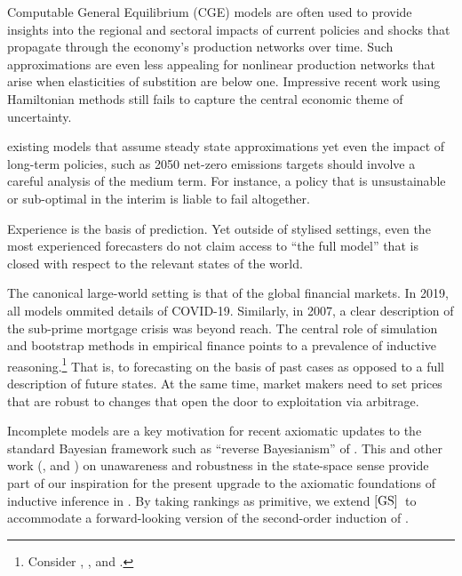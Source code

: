 \documentclass[12pt,a4paper,twoside]{article}
\newcommand{\gsii}{$\textup{[GS]}$}
\begin{document}
  Computable General Equilibrium (CGE)
  models are often used to provide insights into the regional and sectoral
  impacts of current policies and shocks that propagate through the economy's
  production networks over time.
  Such approximations are even less appealing for nonlinear production networks
  that arise when elasticities of substition are below one.
  Impressive recent work using Hamiltonian methods still fails to capture
  the central economic theme of uncertainty.
  
  existing models that assume steady state approximations
  yet even the 
  impact of long-term policies, such as 2050 net-zero emissions targets
  should involve a careful analysis of the medium term.
  For instance, a policy that is unsustainable or sub-optimal in the interim
  is liable to fail altogether.

Experience is the basis of prediction.  Yet outside of stylised settings, even
the most experienced forecasters do not claim  access to ``the full
model'' that is closed  with respect to the relevant states of the
world.
\begin{example}\label{eg-full-model}
  The canonical large-world setting is that of the global financial markets.  In
  2019, all models ommited details of COVID-19. Similarly, in 2007, a clear
  description of the sub-prime mortgage crisis was beyond reach. The central
  role of simulation and bootstrap methods in empirical finance points to a
  prevalence of inductive reasoning.\footnote{Consider
    \citet{Cowles-Forecasting}, \citet{White-Data_snooping},
    \citet{FF-Luck_vs_skill} and \citet{HL-Lucky_factors}.} That is, to
  forecasting on the basis of past cases as opposed to a full description of
  future states. At the same time, market makers need to set prices that
  are robust to changes that open the door to exploitation via arbitrage.
\end{example} 
 \setcounter{page}{2} Incomplete models are a key
motivation for recent axiomatic updates to the standard Bayesian framework such
as ``reverse Bayesianism'' of \citet{KV_Reverse_Bayes}. This and other work
(\citet{KV-Awareness_of_U}, \citet{HR-Knowledge_of_U} and
\citet{GKMQT_Robust_experiments}) on unawareness and robustness in the
state-space sense provide part of our inspiration for the present upgrade to the
axiomatic foundations of inductive inference in \citet[henceforth
\gsii]{GS_Inductive_inference}. By taking rankings as primitive, we extend
\gsii\ to accommodate a forward-looking version of the second-order induction of
\citet{AG-Second-order_induction}. 
\end{document}
